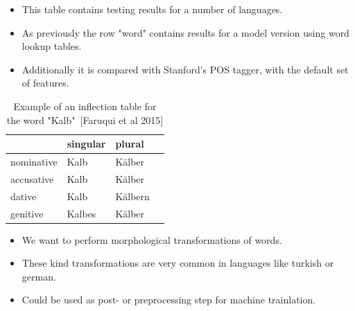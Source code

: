 \documentclass[11pt, a4paper, landscape]{article}
\begin{document}
\vfill
\begin{itemize}

\item This table contains testing results for a number of languages.
\item As previously the row "word" contains results for a model version using word lookup tables.
\item Additionally it is compared with Stanford’s POS tagger, with the default set of features. 
\end{itemize}
\vfill


\NewPage{}

\vfill
\begin{table}
\begin{center}
\begin{tabular}{ l l l l }
  \hline
             & singular & plural \\ \hline
  nominative & Kalb & K\"alber \\
  accusative & Kalb & K\"alber \\
  dative & Kalb & K\"albern \\
  genitive & Kalbes & K\"alber \\
\end{tabular}
\end{center}
\caption{Example of an inflection table for the word "Kalb"~[Faruqui et al 2015]}
\end{table}
\vfill
\begin{itemize}
\item We want to perform morphological transformations of words.
\item These kind transformations are very common in languages like turkish or german.
\item Could be used as post- or preprocessing step for machine trainlation.
\end{itemize}
\vfill

\NewPage{}
\end{document}
